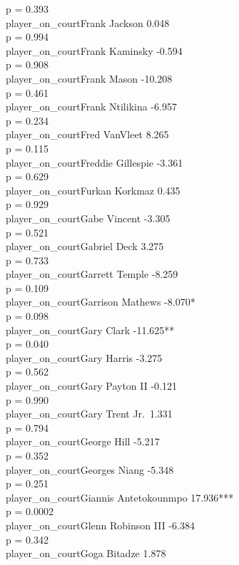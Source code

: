 \documentclass[
  landscape]{article}
\begin{document}
p = 0.393\\
player\_on\_courtFrank Jackson 0.048\\
p = 0.994\\
player\_on\_courtFrank Kaminsky -0.594\\
p = 0.908\\
player\_on\_courtFrank Mason -10.208\\
p = 0.461\\
player\_on\_courtFrank Ntilikina -6.957\\
p = 0.234\\
player\_on\_courtFred VanVleet 8.265\\
p = 0.115\\
player\_on\_courtFreddie Gillespie -3.361\\
p = 0.629\\
player\_on\_courtFurkan Korkmaz 0.435\\
p = 0.929\\
player\_on\_courtGabe Vincent -3.305\\
p = 0.521\\
player\_on\_courtGabriel Deck 3.275\\
p = 0.733\\
player\_on\_courtGarrett Temple -8.259\\
p = 0.109\\
player\_on\_courtGarrison Mathews -8.070*\\
p = 0.098\\
player\_on\_courtGary Clark -11.625**\\
p = 0.040\\
player\_on\_courtGary Harris -3.275\\
p = 0.562\\
player\_on\_courtGary Payton II -0.121\\
p = 0.990\\
player\_on\_courtGary Trent Jr.~1.331\\
p = 0.794\\
player\_on\_courtGeorge Hill -5.217\\
p = 0.352\\
player\_on\_courtGeorges Niang -5.348\\
p = 0.251\\
player\_on\_courtGiannis Antetokounmpo 17.936***\\
p = 0.0002\\
player\_on\_courtGlenn Robinson III -6.384\\
p = 0.342\\
player\_on\_courtGoga Bitadze 1.878\\
\end{document}
